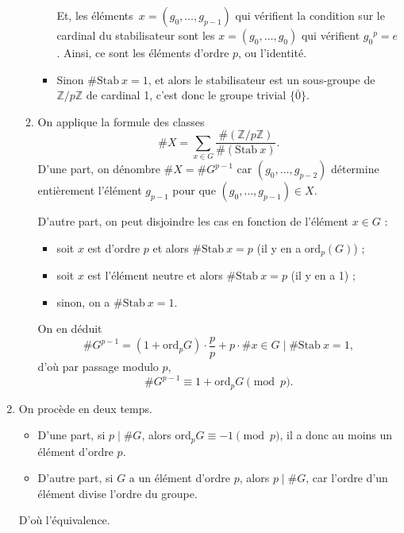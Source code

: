 \documentclass{../../td}
\begin{document}
\begin{enumerate}
\begin{enumerate}
\begin{itemize}
              Et, les éléments~$x = (g_0,\ldots,g_{p-1})$ qui vérifient la condition sur le cardinal du stabilisateur sont les $x = (g_0, \ldots, g_0)$ qui vérifient ${g_0}^p = e$.
              Ainsi, ce sont les éléments d'ordre $p$, ou l'identité.
            \item Sinon $\# \mathrm{Stab}\ x = 1$, et alors le stabilisateur est un sous-groupe de $\mathds{Z} / p \mathds{Z}$ de cardinal 1, c'est donc le groupe trivial $\{\bar{0}\}$.
          \end{itemize}
        \item On applique la formule des classes \[
          \# X = \sum_{x \in G} \frac{\#(\mathds{Z}/p\mathds{Z})}{\#(\mathrm{Stab}\ x)}
          .\]
          D'une part, on dénombre $\# X = \# G^{p-1}$ car $(g_0,\ldots, g_{p-2})$ détermine entièrement l'élément $g_{p-1}$ pour que $(g_0, \ldots, g_{p-1}) \in X$.

          D'autre part, on peut disjoindre les cas en fonction de l'élément $x \in G$ :
          \begin{itemize}
            \item soit $x$ est d'ordre $p$ et alors $\#\mathrm{Stab}\ x = p$ (il y en a $\mathrm{ord}_p (G)$) ;
            \item soit $x$ est l'élément neutre et alors $\#\mathrm{Stab}\ x = p$ (il y en a 1) ;
            \item sinon, on a $\# \mathrm{Stab}\ x = 1$.
          \end{itemize}

          On en déduit \[
            \# G^{p-1} = (1 + \mathrm{ord}_p G)\cdot \frac{p}{p} + p \cdot \# { x \in G  \mid \# \mathrm{Stab}\ x = 1 }
          ,\] 
          d'où par passage modulo $p$,
          \[
          \# G^{p-1} \equiv 1 + \mathrm{ord}_p G \pmod p
          .\]
      \end{enumerate}
    \item On procède en deux temps.
      \begin{itemize}
        \item D'une part, si $p  \mid \# G$, alors $\mathrm{ord}_p G \equiv -1 \pmod p$, il a donc au moins un élément d'ordre $p$.
        \item D'autre part, si $G$ a un élément d'ordre $p$, alors $p  \mid \# G$, car l'ordre d'un élément divise l'ordre du groupe.
      \end{itemize}
      D'où l'équivalence.
  \end{enumerate}
\end{document}
